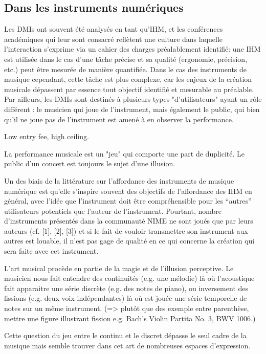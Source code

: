 \subsection*{Dans les instruments numériques}


Les \glspl{DMI} ont souvent été analysés en tant qu'\gls{IHM}, et les conférences académiques qui leur sont consacré reflètent une culture dans laquelle l'interaction s'exprime via un cahier des charges préalablement identifié: une \gls{IHM} est utilisée dans le cas d'une tâche précise et sa qualité (ergonomie, précision, etc.) peut être mesurée de manière quantifiée.
Dans le cas des instruments de musique cependant, cette tâche est plus complexe, car les enjeux de la création musicale dépassent par essence tout objectif identifié et mesurable au préalable. Par ailleurs, les \glspl{DMI} sont destinés à plusieurs types "d'utilisateurs" ayant un rôle différent : le musicien qui joue de l'instrument, mais également le public, qui bien qu'il ne joue pas de l'instrument est amené à en observer la performance.

Low entry fee, high ceiling.

La performance musicale est un "jeu" qui comporte une part de duplicité. Le public d'un concert est toujours le sujet d'une illusion. 

Un des biais de la littérature sur l’affordance des instruments de musique numérique est qu’elle s’inspire souvent des objectifs de l’affordance des IHM en général, avec l’idée que l’instrument doit être compréhensible pour les “autres” utilisateurs potentiels que l’auteur de l’instrument. Pourtant, nombre d’instruments présentés dans la communauté NIME ne sont joués que par leurs auteurs (cf. [1], [2], [3]) et si le fait de vouloir transmettre son instrument aux autres est louable, il n’est pas gage de qualité en ce qui concerne la création qui sera faite avec cet instrument. 


L'art musical procède en partie de la magie et de l'illusion perceptive. Le musicien nous fait entendre des continuités (e.g. une mélodie) là où l'acoustique fait apparaitre une série discrète (e.g. des notes de piano), ou inversement des fissions (e.g. deux voix indépendantes) là où est jouée une série temporelle de notes sur un même instrument. (=> plutôt que des exemple entre parenthèse, mettre une figure illustrant fission e.g. Bach's Violin Partita No. 3, BWV 1006.)

Cette question du jeu entre le continu et le discret dépasse le seul cadre de la musique mais semble trouver dans cet art de nombreuses espaces d'expression.

